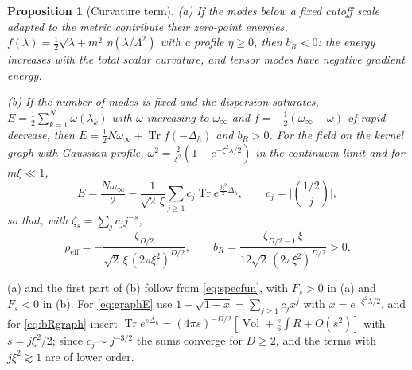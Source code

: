 \documentclass[11pt,a4paper]{article}
\makeatletter
\theoremstyle{stmt}
\newtheorem{proposition}[theorem]{Proposition}
\theoremstyle{defn}
\theoremstyle{rmk}
\renewenvironment{proof}[1][\proofname]{\par\pushQED{\qed}\normalfont\topsep6\p@\@plus6\p@\relax
  \trivlist\item[\hskip\labelsep{\sffamily\itshape\small #1.}]\ignorespaces}{\popQED\endtrivlist\@endpefalse}
\numberwithin{equation}{section}
\DeclareMathOperator{\Tr}{Tr}
\DeclareMathOperator{\Vol}{Vol}
\makeatother
\begin{document}
\begin{proposition}[Curvature term]\label{prop:curvterm}
\textup{(a)} If the modes below a fixed cutoff scale adapted to the metric contribute their zero-point energies, $f(\lambda)=\tfrac12\sqrt{\lambda+m^2}\,\eta(\lambda/\Lambda^2)$ with a profile $\eta\ge0$, then $b_R<0$: the energy increases with the total scalar curvature, and tensor modes have negative gradient energy.

\textup{(b)} If the number of modes is fixed and the dispersion saturates, $E=\tfrac12\sum_{k=1}^N\omega(\lambda_k)$ with $\omega$ increasing to $\omega_\infty$ and $f=-\tfrac12(\omega_\infty-\omega)$ of rapid decrease, then $E=\tfrac12N\omega_\infty+\Tr f(-\Delta_h)$ and $b_R>0$. For the field on the kernel graph with Gaussian profile, $\omega^2=\tfrac2{\xi^2}(1-e^{-\xi^2\lambda/2})$ in the continuum limit and for $m\xi\ll1$,
\begin{equation}\label{eq:graphE}
E=\frac{N\omega_\infty}2-\frac{1}{\sqrt2\,\xi}\sum_{j\ge1}c_j\Tr e^{\frac{j\xi^2}2\Delta_h},\qquad c_j=\Big|\binom{1/2}{j}\Big|,
\end{equation}
so that, with $\zeta_s=\sum_jc_jj^{-s}$,
\begin{equation}\label{eq:bRgraph}
\rho_{\mathrm{eff}}=-\frac{\zeta_{D/2}}{\sqrt2\,\xi\,(2\pi\xi^2)^{D/2}},\qquad b_R=\frac{\zeta_{D/2-1}\,\xi}{12\sqrt2\,(2\pi\xi^2)^{D/2}}>0 .
\end{equation}
\end{proposition}

\begin{proof}
(a) and the first part of (b) follow from \eqref{eq:specfun}, with $F_s>0$ in (a) and $F_s<0$ in (b). For \eqref{eq:graphE} use $1-\sqrt{1-x}=\sum_{j\ge1}c_jx^j$ with $x=e^{-\xi^2\lambda/2}$, and for \eqref{eq:bRgraph} insert $\Tr e^{s\Delta_h}=(4\pi s)^{-D/2}[\Vol+\tfrac s6\int R+O(s^2)]$ with $s=j\xi^2/2$; since $c_j\sim j^{-3/2}$ the sums converge for $D\ge2$, and the terms with $j\xi^2\gtrsim1$ are of lower order.
\end{proof}
\end{document}
